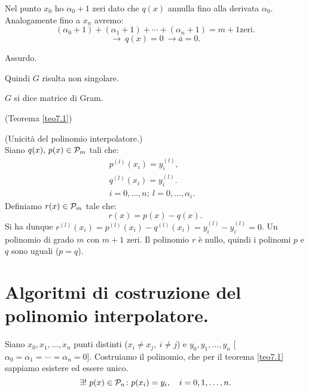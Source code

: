 \begin{dimo}
\begin{dimo}
Nel punto $x_0$ ho $\alpha_0 + 1$ zeri dato che $q(x)$ annulla fino alla
derivata $\alpha_0$. Analogamente fino a $x_n$ avremo:
\[(\alpha_0 +1) + (\alpha_1 + 1) + \cdots + (\alpha_n + 1) = m +1 \textrm{
zeri.}\]
\[\longrightarrow \ q(x) = 0 \ \longrightarrow \overline{a} = 0.\]
\begin{flushright}Assurdo.\end{flushright}
Quindi $G$ risulta non singolare.
\end{dimo}

$G$ si dice matrice di Gram.
\begin{flushright}(Teorema \ref{teo7.1})
\end{flushright}
\end{dimo}

\begin{osse}
(Unicità del polinomio interpolatore.)\\
Siano $q(x), \, p(x) \in \mathcal{P}_m$ tali che:
\[
\begin{array}{cc}
p^{(l)}(x_i) = y_i^{(l)}, &  \\
q^{(l)}(x_i) = y_i^{(l)}.& \\
i = 0,\ldots, n;\ l = 0, \ldots, \alpha_i .
\end{array}
\]
Definiamo $r(x) \in \mathcal{P}_m$ tale che:
\[r(x) = p(x) - q(x).\]
Si ha dunque $r^{(l)}(x_i) = p^{(l)}(x_i) - q^{(l)}(x_i) = y_i^{(l)} - y_i^{(l)} =
0$. Un polinomio di grado $m$ con $m+1$ zeri. Il polinomio $r$ è nullo, quindi
i polinomi $p$ e $q$ sono uguali ($p=q$).
\end{osse}

\section{Algoritmi di costruzione del polinomio interpolatore.}
Siano $x_0, x_1, \ldots, x_n$ punti distinti ($x_i \neq x_j, \ i\neq
j$) e $y_0, y_1, \ldots, y_n$ [$\alpha_0 = \alpha_1 = \cdots
 = \alpha_n = 0$]. Costruiamo il polinomio, che per il teorema \ref{teo7.1}
sappiamo esistere ed essere unico.
\[\exists!\ p(x) \in \mathcal{P}_n \colon p(x_i) = y_i, \quad i = 0,1, \ldots, n.\]

